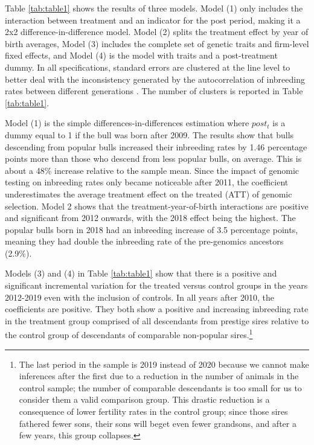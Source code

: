 \documentclass[12pt,letterpaper]{article}
\begin{document}


Table \ref{tab:table1} shows the results of three models.  Model (1) only includes the interaction between treatment and an indicator for the post period, making it a 2x2 difference-in-difference model. Model (2) splits the treatment effect by year of birth averages, Model (3) includes the complete set of genetic traits and firm-level fixed effects, and Model (4) is the model with traits and a post-treatment dummy. In all specifications, standard errors are clustered at the line level to better deal with the inconsistency generated by the autocorrelation of inbreeding rates between different generations \citep{Bertrand2004}. The number of clusters is reported in Table \ref{tab:table1}. %

Model (1) is the simple differences-in-differences estimation where $post_{t}$ is a dummy equal to 1 if the bull was born after 2009. The results show that bulls descending from popular bulls increased their inbreeding rates by 1.46 percentage points more than those who descend from less popular bulls, on average.
This is about a 48\% increase relative to the sample mean.
Since the impact of genomic testing on inbreeding rates only became noticeable after 2011, the coefficient underestimates the average treatment effect on the treated (ATT) of genomic selection. Model 2 shows that the treatment-year-of-birth interactions are positive and significant from 2012 onwards, with the 2018 effect being the highest.
The popular bulls born in 2018 had an inbreeding increase of 3.5 percentage points, meaning they had double the inbreeding rate of the pre-genomics ancestors (2.9\%).

Models (3) and (4) in Table \ref{tab:table1} show that there is a positive and significant incremental variation for the treated versus control groups in the years 2012-2019 even with the inclusion of controls. In all years after 2010, the coefficients are positive. 
They both show a positive and increasing inbreeding rate in the treatment group comprised of all descendants from prestige sires relative to the control group of descendants of comparable non-popular sires.\footnote{The last period in the sample is 2019 instead of 2020 because we cannot make inferences after the first due to a reduction in the number of animals in the control sample; the number of comparable descendants is too small for us to consider them a valid comparison group. This drastic reduction is a consequence of lower fertility rates in the control group; since those sires fathered fewer sons, their sons will beget even fewer grandsons, and after a few years, this group collapses.} 
\end{document}
